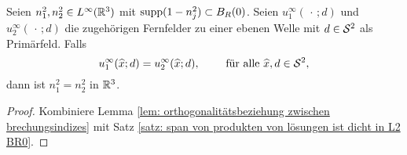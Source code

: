 \begin{satz}
	Seien \(n_1^2,n_2^2\in L^\infty(\mathbb{R}^3)\) mit \(\operatorname{supp}(1-n_j^2)\subset B_R(0)\). Seien \(u_1^\infty(\,\cdot\,;d)\) und \(u_2^\infty(\,\cdot\,;d)\) die zugehörigen Fernfelder zu einer ebenen Welle mit \(d\in\mathcal{S}^2\) als Primärfeld. Falls
	\begin{equation*}
		u_1^\infty(\widehat{x};d)=u_2^\infty(\widehat{x};d),\qquad\text{ für alle }\widehat{x},d\in\mathcal{S}^2,
	\end{equation*}
	dann ist \(n_1^2=n_2^2\) in \(\mathbb{R}^3\).
\end{satz}
\begin{proof}
	Kombiniere Lemma \ref{lem: orthogonalitätsbeziehung zwischen brechungsindizes} mit Satz \ref{satz: span von produkten von lösungen ist dicht in L2 BR0}.
\end{proof}

























